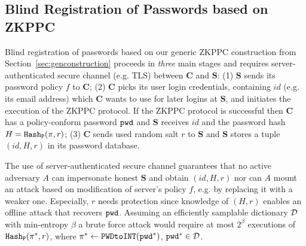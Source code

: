 %


\subsection{Blind Registration of Passwords based on ZKPPC}\label{sec:pwreg}
Blind registration of passwords based on our generic ZKPPC construction from Section~\ref{sec:genconstruction} proceeds in \emph{three} main stages and requires server-authenticated secure channel (e.g. TLS) between $\bm{C}$ and $\bm{S}$: (1) $\bm{S}$ sends its password policy $f$ to $\bm{C}$; (2) $\bm{C}$ picks its user login credentials, containing $id$ (e.g. its email address) which $\bm{C}$ wants to use for later logins at $\bm{S}$, and initiates the execution of the ZKPPC protocol. If the ZKPPC protocol is successful then $\bm{C}$ has a policy-conform password $\mathtt{pwd}$ and $\bm{S}$ receives $id$ and the password hash $H=\mathtt{Hash_P}(\pi,r)$; (3) $\bm{C}$ sends used random salt $r$ to $\bm{S}$ and $\bm{S}$ stores a tuple $(id, H, r)$ in its password database.

The use of server-authenticated secure channel guarantees that no active adversary $A$ can impersonate honest $\bm{S}$ and obtain $(id, H, r)$ nor can $A$ mount an attack based on modification of server's policy $f$, e.g. by replacing it with a weaker one.
Especially, $r$ needs protection since knowledge of $(H, r)$ enables an offline attack that recovers $\mathtt{pwd}$. Assuming an efficiently samplable dictionary $\mathcal{D}$ with min-entropy $\beta$ a brute force attack would require at most $2^\beta$ executions of $\mathtt{Hash_P}(\pi^\ast,r)$, where $\pi^\ast \gets \texttt{PWDtoINT}(\mathtt{pwd}^\ast)$, $\mathtt{pwd}^\ast\in\mathcal{D}$.


